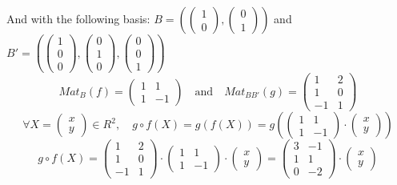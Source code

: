 \documentclass[notitlepage]{math}
\begin{document}
And with the following basis:
$B = (\begin{pmatrix} 1 \\ 0 \end{pmatrix}, \begin{pmatrix} 0 \\ 1 \end{pmatrix})$ and $B' = (\begin{pmatrix} 1 \\ 0 \\ 0 \end{pmatrix}, \begin{pmatrix} 0 \\ 1 \\ 0 \end{pmatrix}, \begin{pmatrix} 0 \\ 0 \\ 1 \end{pmatrix})$ \\
\[ Mat_B(f)= \begin{pmatrix}
        1 & 1 \\
        1 & -1
    \end{pmatrix} \quad \text{and} \quad Mat_{BB'}(g)=\begin{pmatrix}
        1 & 2  \\
        1 & 0  \\
        -1 & 1
    \end{pmatrix}\]
    \[ \forall X = \begin{pmatrix} x \\ y \end{pmatrix} \in R^2, \quad g \circ f(X) = g(f(X)) = g \left(\begin{pmatrix}
        1 & 1 \\
        1 & -1
    \end{pmatrix} \cdot \begin{pmatrix}
        x \\
        y
    \end{pmatrix} \right)\]
    \[ g \circ f(X) =
        \begin{pmatrix}
        1 & 2  \\
        1 & 0  \\
        -1 & 1
    \end{pmatrix} \cdot \begin{pmatrix}
        1 & 1 \\
        1 & -1
    \end{pmatrix} \cdot \begin{pmatrix}
        x \\
        y
    \end{pmatrix} = \begin{pmatrix}
        3 & -1 \\
        1 & 1 \\
        0 & -2 
    \end{pmatrix} \cdot \begin{pmatrix}
        x \\
        y
    \end{pmatrix} \]
\end{document}

